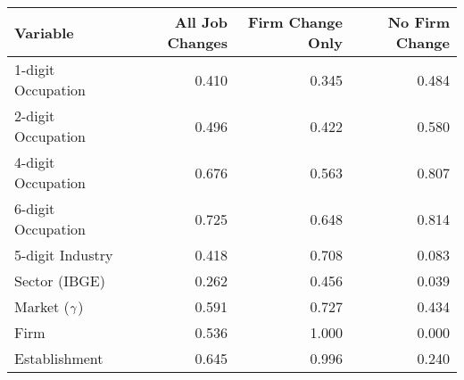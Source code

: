 \begin{tabular}{lrrr}
\toprule
           Variable &  All Job Changes &  Firm Change Only &  No Firm Change \\
\midrule
 1-digit Occupation &     0.410 &                   0.345 &                      0.484 \\
 2-digit Occupation &     0.496 &                   0.422 &                      0.580 \\
 4-digit Occupation &     0.676 &                   0.563 &                      0.807 \\
 6-digit Occupation &     0.725 &                   0.648 &                      0.814 \\
   5-digit Industry &     0.418 &                   0.708 &                      0.083 \\
      Sector (IBGE) &     0.262 &                   0.456 &                      0.039 \\
      Market ($\gamma$) &     0.591 &                   0.727 &                      0.434 \\
               Firm &     0.536 &                   1.000 &                      0.000 \\
      Establishment &     0.645 &                   0.996 &                      0.240 \\
\bottomrule
\end{tabular}
